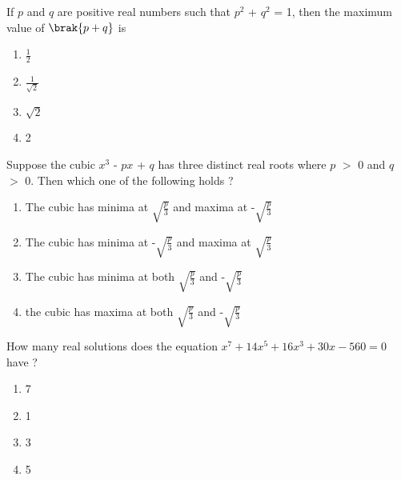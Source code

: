         \item If $p$ and $q$ are positive real numbers such that $p^2$ + $q^2$ = 1,     
   then the maximum value of $\brak{p + q}$ is\hfill{}
         \begin{multicols}{4}
        \begin{enumerate}
        
            

        \item $\frac{1}{2}$
        \item $\frac{1}{\sqrt{2}}$
        \item $\sqrt{2}$
        \item 2
        \end{enumerate}
        \end{multicols}
            
        \item Suppose the cubic $x^3$ - $p$$x$ + $q$ has three distinct real roots where $p$ $>$ 0 and $q$ $>$ 0. Then which one of the following holds ? \hfill{}
         
        \begin{enumerate}
        
            
        
        \item The cubic has minima at $\sqrt{\frac{p}{3}}$ and maxima at -$\sqrt{\frac{p}{3}}$
        \item The cubic has minima at -$\sqrt{\frac{p}{3}}$ and maxima at $\sqrt{\frac{p}{3}}$
        \item The cubic has minima at both $\sqrt{\frac{p}{3}}$ and -$\sqrt{\frac{p}{3}}$
        \item the cubic has maxima at both $\sqrt{\frac{p}{3}}$ and -$\sqrt{\frac{p}{3}}$
        
        
        \end{enumerate}
        
            
        \item How many real solutions does the equation $ x^7 + 14x^5 + 16x^3 + 30x- 560 = 0$ have ? \hfill{}
         \begin{multicols}{4}
        \begin{enumerate}
    
            
        
            \item 7
        \item 1
        \item 3
        \item 5
        
        \end{enumerate}
        \end{multicols}
            
